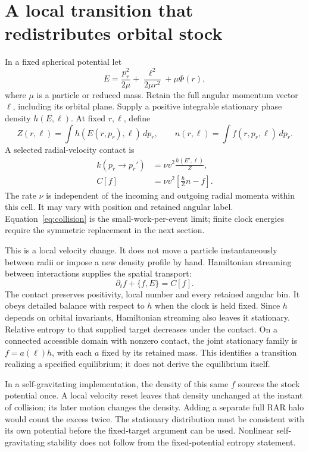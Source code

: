 \documentclass[11pt]{article}
\begin{document}
\section{A local transition that redistributes orbital stock}
In a fixed spherical potential let
\begin{equation}
 E=\frac{p_r^2}{2\mu}+\frac{\ell^2}{2\mu r^2}+\mu\Phi(r),
\end{equation}
where $\mu$ is a particle or reduced mass. Retain the full angular momentum
vector $\boldsymbol\ell$, including its orbital plane. Supply a positive
integrable stationary phase density $h(E,\boldsymbol\ell)$. At fixed
$r,\boldsymbol\ell$, define
\begin{equation}
 Z(r,\boldsymbol\ell)=\int h(E(r,p_r),\boldsymbol\ell)\,dp_r,
 \qquad n(r,\boldsymbol\ell)=\int f(r,p_r,\boldsymbol\ell)\,dp_r.
\end{equation}
A selected radial-velocity contact is
\begin{align}
 k(p_r\to p_r')&=\nu v^2\frac{h(E',\boldsymbol\ell)}{Z},\label{eq:rate}\\
 C[f]&=\nu v^2\left[\frac{h}{Z}n-f\right].\label{eq:collision}
\end{align}
The rate $\nu$ is independent of the incoming and outgoing radial momenta
within this cell. It may vary with position and retained angular label.
Equation~\eqref{eq:collision} is the small-work-per-event limit; finite
clock energies require the symmetric replacement in the next section.

This is a local velocity change. It does not move a particle instantaneously
between radii or impose a new density profile by hand. Hamiltonian streaming
between interactions supplies the spatial transport:
\begin{equation}\label{eq:kinetic}
 \partial_t f+\{f,E\}=C[f].
\end{equation}
The contact preserves positivity, local number and every retained angular
bin. It obeys detailed balance with respect to $h$ when the clock is held
fixed. Since $h$ depends on orbital invariants, Hamiltonian streaming also
leaves it stationary. Relative entropy to that supplied target decreases
under the contact. On a connected accessible domain with nonzero contact,
the joint stationary family is $f=a(\boldsymbol\ell)h$, with each
$a$ fixed by its retained mass. This identifies a transition realizing a
specified equilibrium; it does not derive the equilibrium itself.

In a self-gravitating implementation, the density of this same $f$ sources
the stock potential once. A local velocity reset leaves that density
unchanged at the instant of collision; its later motion changes the density.
Adding a separate full RAR halo would count the excess twice. The stationary
distribution must be consistent with its own potential before the fixed-target
argument can be used. Nonlinear self-gravitating stability does not follow
from the fixed-potential entropy statement.
\end{document}

